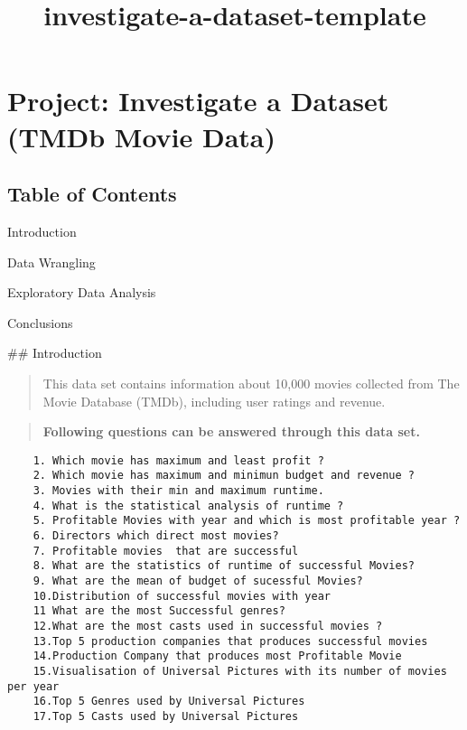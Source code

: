 \documentclass[11pt]{article}
\title{investigate-a-dataset-template}
\begin{document}
    
    
    \maketitle
    
    

    
    \section{Project: Investigate a Dataset (TMDb Movie
Data)}\label{project-investigate-a-dataset-tmdb-movie-data}

\subsection{Table of Contents}\label{table-of-contents}

Introduction

Data Wrangling

Exploratory Data Analysis

Conclusions

     \#\# Introduction

\begin{quote}
This data set contains information about 10,000 movies collected from
The Movie Database (TMDb), including user ratings and revenue.
\end{quote}

\begin{quote}
\textbf{Following questions can be answered through this data set.}
\end{quote}

\begin{verbatim}
    1. Which movie has maximum and least profit ?
    2. Which movie has maximum and minimun budget and revenue ?
    3. Movies with their min and maximum runtime.
    4. What is the statistical analysis of runtime ?
    5. Profitable Movies with year and which is most profitable year ?
    6. Directors which direct most movies?
    7. Profitable movies  that are successful
    8. What are the statistics of runtime of successful Movies?
    9. What are the mean of budget of sucessful Movies?
    10.Distribution of successful movies with year
    11 What are the most Successful genres?
    12.What are the most casts used in successful movies ?
    13.Top 5 production companies that produces successful movies
    14.Production Company that produces most Profitable Movie
    15.Visualisation of Universal Pictures with its number of movies per year
    16.Top 5 Genres used by Universal Pictures
    17.Top 5 Casts used by Universal Pictures
    
\end{verbatim}
\end{document}
